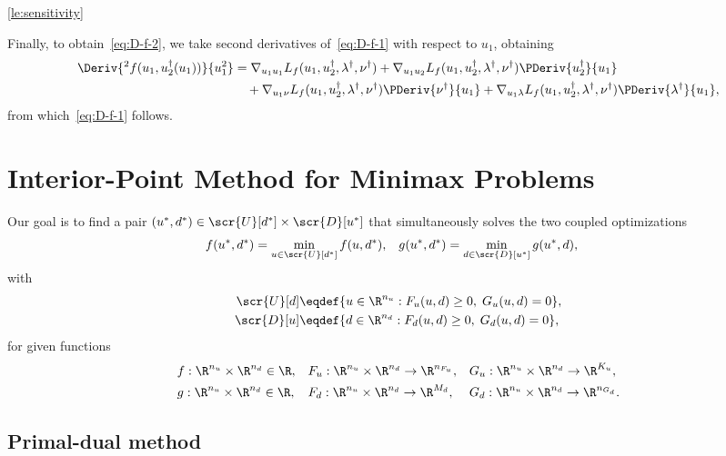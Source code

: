 \documentclass[11pt]{article}
\begin{document}
\begin{proof-lemma}{\ref{le:sensitivity}}
  \medskip

  Finally, to obtain~\eqref{eq:D-f-2}, we take second derivatives
  of~\eqref{eq:D-f-1} with respect to $u_1$, obtaining
  \begin{align*}
    \Deriv{^2f(u_1,u_2^\dagger(u_1))}{u_1^2}
    &=
    \nabla_{u_1u_1}L_f(u_1,u_2^\dagger,\lambda^\dagger,\nu^\dagger)
    +\nabla_{u_1u_2}L_f(u_1,u_2^\dagger,\lambda^\dagger,\nu^\dagger)\PDeriv{u_2^\dagger}{u_1}\\&\quad
    +\nabla_{u_1\nu}L_f(u_1,u_2^\dagger,\lambda^\dagger,\nu^\dagger)\PDeriv{\nu^\dagger}{u_1}
    +\nabla_{u_1\lambda}L_f(u_1,u_2^\dagger,\lambda^\dagger,\nu^\dagger)\PDeriv{\lambda^\dagger}{u_1},
  \end{align*}
  from which~\eqref{eq:D-f-1} follows.\frQED
\end{proof-lemma}

\section{Interior-Point Method for Minimax Problems}
\label{sec:ipm}

Our goal is to find a pair
$(u^*,d^*)\in\scr{U}[d^*]\times\scr{D}[u^*]$ that simultaneously
solves the two coupled optimizations
\begin{align}\label{eq:equilibria}
  f(u^*,d^*)&=\min_{u\in\scr{U}[d^*]} f(u,d^*), &
  g(u^*,d^*)&=\min_{d\in\scr{D}[u^*]} g(u^*,d),
\end{align}
with
\begin{align*}
    \scr{U}[d]&\eqdef\{u\in\R^{n_u}: F_u(u,d)\ge 0,\; G_u(u,d)=0\}, \\
    \scr{D}[u]&\eqdef\{d\in\R^{n_d}: F_d(u,d)\ge 0,\; G_d(u,d)=0\},
\end{align*}
for given functions
\begin{align*}
  &f:\R^{n_u}\times\R^{n_d}\in\R, &
  &F_u:\R^{n_u}\times\R^{n_d}\to\R^{n_{F_u}}, &
  &G_u:\R^{n_u}\times\R^{n_d}\to\R^{K_u},\\
  &g:\R^{n_u}\times\R^{n_d}\in\R, &
  &F_d:\R^{n_u}\times\R^{n_d}\to\R^{M_d}, &
  &G_d:\R^{n_u}\times\R^{n_d}\to\R^{n_{G_d}}.
\end{align*}


\subsection{Primal-dual method}
\end{document}
